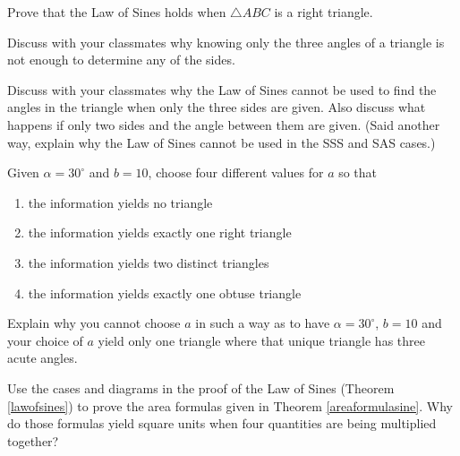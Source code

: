 \documentclass{ximera}
\begin{document}
\begin{problem}
Prove that the Law of Sines holds when $\triangle ABC$ is a right triangle.
\end{problem}

\begin{problem}
Discuss with your classmates why knowing only the three angles of a triangle is not enough to determine any of the sides.
\end{problem}

\begin{problem}
Discuss with your classmates why the Law of Sines cannot be used to find the angles in the triangle when only the three sides are given.  Also discuss what happens if only two sides and the angle between them are given.  (Said another way, explain why the Law of Sines cannot be used in the SSS and SAS cases.)
\end{problem}

\begin{problem}
Given $\alpha = 30^{\circ}$ and $b = 10$, choose four different values for $a$ so that 

\begin{enumerate}

\item the information yields no triangle
\item the information yields exactly one right triangle
\item the information yields two distinct triangles
\item the information yields exactly one obtuse triangle

\end{enumerate}

Explain why you cannot choose $a$ in such a way as to have $\alpha = 30^{\circ}$, $b = 10$ and your choice of $a$ yield only one triangle where that unique triangle has three acute angles.
\end{problem}

\begin{problem}
Use the cases and diagrams in the proof of the Law of Sines (Theorem \ref{lawofsines}) to prove the area formulas given in Theorem \ref{areaformulasine}.  Why do those formulas yield square units when four quantities are being multiplied together?
\end{problem}
\end{document}
